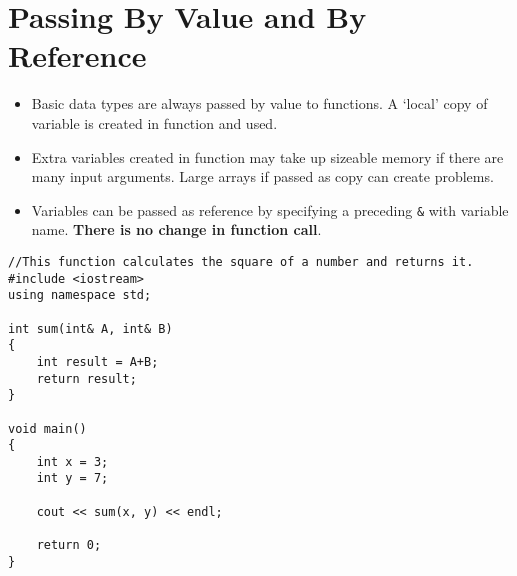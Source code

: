 \documentclass[12pt,a4paper]{article}
\begin{document}
\section{Passing By Value and By Reference}
\begin{itemize}
\item Basic data types are always passed by value to functions. A `local' copy of variable is created in function and used.
\item Extra variables created in function may take up sizeable memory if there are many input arguments. Large arrays if passed as copy can create problems.
\item Variables can be passed as reference by specifying a preceding \verb|&| with variable name. \textbf{There is no change in function call}.
\end{itemize}
\begin{lstlisting}[caption={Passing Function Arguments as Reference}]
//This function calculates the square of a number and returns it.
#include <iostream>
using namespace std;

int sum(int& A, int& B)
{
    int result = A+B;
    return result;
}

void main()
{
    int x = 3;
    int y = 7;
    
    cout << sum(x, y) << endl;
    
    return 0;
}
\end{lstlisting}
\end{document}

